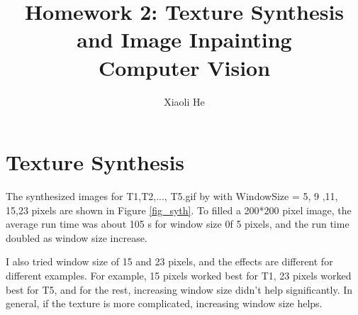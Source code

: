 \documentclass{extarticle}
\theoremstyle{definition}
\theoremstyle{definition}
\begin{document}
\title{Homework 2: Texture Synthesis and Image Inpainting \\
	Computer Vision}
\author{Xiaoli He}
\maketitle
\newpage

\section{Texture Synthesis}
The synthesized images for T1,T2,..., T5.gif by with WindowSize = 5, 9 ,11, 15,23 pixels are shown in Figure \ref{fig_syth}. To filled a 200*200 pixel image, the average run time was about 105 s for window size 0f 5 pixels, and the run time doubled as window size increase. 

I also tried window size of 15 and 23 pixels, and the effects are different for different examples. For example, 15 pixels worked best for T1, 23 pixels worked best for T5, and for the rest, increasing window size didn't help significantly. In general, if the texture is more complicated, increasing window size helps. 
\end{document}
